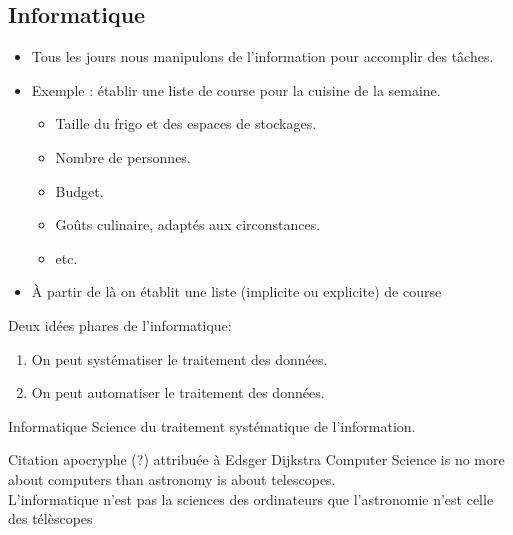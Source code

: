 \documentclass{beamer}
\begin{document}
\subsection{Informatique}

\begin{frame}
	\begin{itemize}
	\item Tous les jours nous manipulons de l'information pour accomplir des tâches.
	\item Exemple : établir une liste de course pour la cuisine de la semaine.
		
		\begin{itemize}
			\item Taille du frigo et des espaces de stockages.
			\item Nombre de personnes.
			\item Budget.
			\item Goûts culinaire, adaptés aux circonstances.
			\item etc.
		\end{itemize}
	\item À partir de là on établit une liste (implicite ou explicite) de course
	
	\end{itemize}
\end{frame}

\begin{slide}

Deux idées phares de l'informatique:
	\begin{enumerate}
		\item On peut systématiser le traitement des données.
		\item On peut automatiser le traitement des données.
	\end{enumerate}
\end{slide}

\begin{slide}

	
	
	\begin{block}{Informatique}
	Science du traitement systématique de l'information.
	\end{block}
	
	
	\begin{exampleblock}{Citation apocryphe (?) attribuée à Edsger Dijkstra}%
	Computer Science is no more about computers than astronomy is about telescopes.\\
	
	L'informatique n'est pas la sciences des ordinateurs que l'astronomie n'est celle des télèscopes
	\end{exampleblock}
	
\end{slide}
\end{document}
